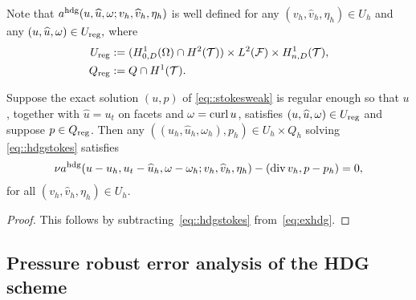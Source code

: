 Note that $a^{\operatorname{hdg}}(u, \widehat u, \omega; v_h, \widehat v_h, \eta_h)$ is well
defined for any $(v_h, \hat v_h, \eta_h) \in U_h$ and any
$(u, \widehat u, \omega) \in U_{\operatorname{reg}},$ where
\begin{subequations}\label{def::ureg}
  \begin{align}
    U_{\operatorname{reg}} &:= (H_{0,D}^1(\Omega) \cap H^2(\mathcal{T})) \times L^2(\mathcal{F}) \times H^1_{n, D}(\mathcal{T}), \\
    Q_{\operatorname{reg}} &:= Q \cap H^1(\mathcal{T}). 
  \end{align}
\end{subequations}


\begin{lemma} \label{lem::hdg_consistency}
  Suppose the exact solution
  $(u,p)$ of \eqref{eq::stokesweak} is regular enough so that 
  $u$, together with $\hat u = u_t$ on facets and $\omega = \operatorname{curl} u$, satisfies 
  $ (u, \widehat u, \omega)  \in U_{\operatorname{reg}}$ and suppose $p \in Q_{\operatorname{reg}}$. Then any 
  $((u_h, \hat u_h, \omega_h),p_h) \in U_h \times Q_h$ solving
  \eqref{eq::hdgstokes} satisfies
  \begin{align*}
    \nu a^{\operatorname{hdg}}(u-u_h, u_t - \widehat u_h, \omega - \omega_h; v_h, \widehat{v}_h, \eta_h) - (\operatorname{div} v_h,p - p_h) = 0,
  \end{align*}
  for all
  $(v_h, \hat v_h, \eta_h) \in U_h$.
\end{lemma}
\begin{proof}
  This follows by subtracting~\eqref{eq::hdgstokes} from~\eqref{eq:exhdg}.
  \qqed
\end{proof}



\subsection{Pressure robust error analysis of the HDG scheme}


